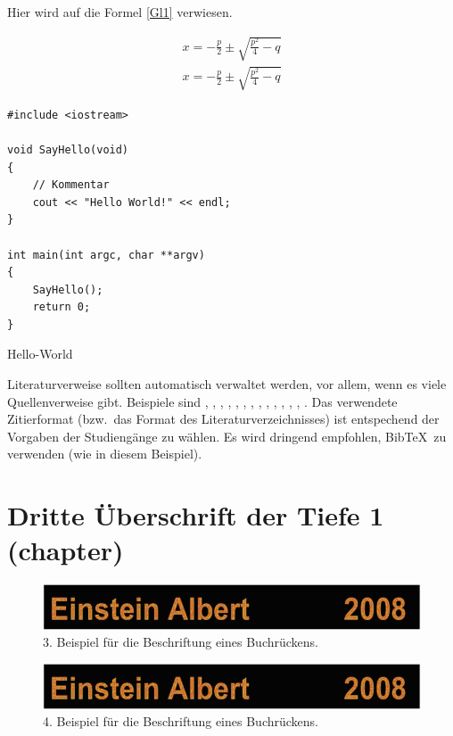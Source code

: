 \documentclass[MMR,Master,ngerman]{twbook}%
\begin{document}
Hier wird auf die Formel \ref{Gl1} verwiesen.

\begin{align}
x = -\frac{p}{2}\pm\sqrt{\frac{p^2}{4}-q}\label{Gl1}
\end{align}
\begin{align}
x = -\frac{p}{2}\pm\sqrt{\frac{p^2}{4}-q}\label{Gl2}
\end{align}

\begin{listing}[htbp]
\begin{verbatim}
#include <iostream>

void SayHello(void)
{
    // Kommentar
    cout << "Hello World!" << endl;
}

int main(int argc, char **argv)
{
    SayHello();
    return 0;
}
\end{verbatim}
\caption{Hello-World}
\end{listing}

Literaturverweise sollten automatisch verwaltet werden, vor allem, wenn es viele Quellenverweise gibt. Beispiele sind  \cite{Ko05a}, \cite{Ko05b}, \cite{MiGo05}, \cite{TeGo14}, \cite{HuHa07}, \cite{HuZi10}, \cite{ZiKu07}, \cite{He07}, \cite{SIE11}, \cite{SIE14}, \cite{ISO98}, \cite{ATM11}, \cite{Hu11}, \cite{Po10}. Das verwendete Zitierformat (bzw.~das Format des Literaturverzeichnisses) ist entspechend der Vorgaben der Studiengänge zu wählen.
Es wird dringend empfohlen, BibTeX~zu verwenden (wie in diesem Beispiel).

\chapter{Dritte Überschrift der Tiefe 1 (chapter)}
\begin{figure}[!htbp]
\centering
\includegraphics[width=0.5\linewidth]{PICs/buchruecken}
\caption{3. Beispiel für die Beschriftung eines Buchrückens.}\label{Abb3}
\end{figure}
\begin{figure}[!htbp]
\centering
\includegraphics[width=0.5\linewidth]{PICs/buchruecken}
\caption{4. Beispiel für die Beschriftung eines Buchrückens.}\label{Abb4}
\end{figure}
\end{document}
